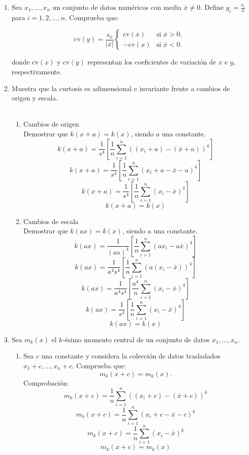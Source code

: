 \documentclass[11pt,a4paper]{report}
\begin{document}
\begin{enumerate}
\item Sea $x_1, \dots, x_n$ un conjunto de datos numéricos con media $\bar{x} \neq 0$. Define $y_i = \frac{x_i}{\bar{x}}$ para $i = 1, 2, \dots, n$. Comprueba que:

    \[
    \text{cv}(y) = \frac{s_x}{|\bar{x}|}
    \begin{cases} 
     \text{cv}(x) & \text{si } \bar{x} > 0, \\
    - \text{cv}(x) & \text{si } \bar{x} < 0.
    \end{cases}
    \]

    donde $\text{cv}(x)$ y $\text{cv}(y)$ representan los coeficientes de variación de $x$ e $y$, respectivamente.

\item Muestra que la curtosis es adimensional e invariante frente a cambios de origen y escala. \\ \\
\begin{enumerate}
    \item Cambios de origen \\ 
    Demostrar que $k(x+a)=k(x)$, siendo $a$ una constante. \\ 
    \[k(x+a)=\frac{1}{s^4}[\frac{1}{n} \sum_{i=1}^n((x_i+a)-(\bar{x}+a))^4]\]
    \[k(x+a)=\frac{1}{s^4}[\frac{1}{n} \sum_{i=1}^n(x_i+a-\bar{x}-a)^4]\]
    \[k(x+a)=\frac{1}{s^4}[\frac{1}{n} \sum_{i=1}^n(x_i-\bar{x})^4]\]
    \[k(x+a)=k(x)\]
    \item  Cambios de escala \\ 
    Demostrar que $k(ax)=k(x)$, siendo $a$ una constante. \\ 
    \[k(ax)=\frac{1}{(as)^4}[\frac{1}{n} \sum_{i=1}^n(ax_i-a\bar{x})^4]\]
    \[k(ax)=\frac{1}{a^4s^4}[\frac{1}{n} \sum_{i=1}^n(a(x_i-\bar{x}))^4]\]
    \[k(ax)=\frac{1}{a^4s^4}[\frac{a^4}{n} \sum_{i=1}^n(x_i-\bar{x})^4]\]
    \[k(ax)=\frac{1}{s^4}[\frac{1}{n} \sum_{i=1}^n(x_i-\bar{x})^4]\]
    \[k(ax)=k(x)\]
\end{enumerate}

\item  Sea $m_k(x)$ el $k$-ésimo momento central de un conjunto de datos $x_1, \dots, x_n$. 
\begin{enumerate}
    \item Sea $c$ una constante y considera la colección de datos trasladados $x_1 + c, \dots, x_n + c$. Comprueba que:
    \[m_k(x + c) = m_k(x).\]
    Comprobación: 
    \[m_k(x + c)=\frac{1}{n} \sum_{i=1}^n((x_i+c)-(\bar{x}+c))^k\]
    \[m_k(x + c)=\frac{1}{n} \sum_{i=1}^n(x_i+c-\bar{x}-c)^k\]
    \[m_k(x + c)=\frac{1}{n} \sum_{i=1}^n(x_i-\bar{x})^k\]
    \[m_k(x + c) = m_k(x)\]


\end{enumerate}
\end{enumerate}
\end{document}
